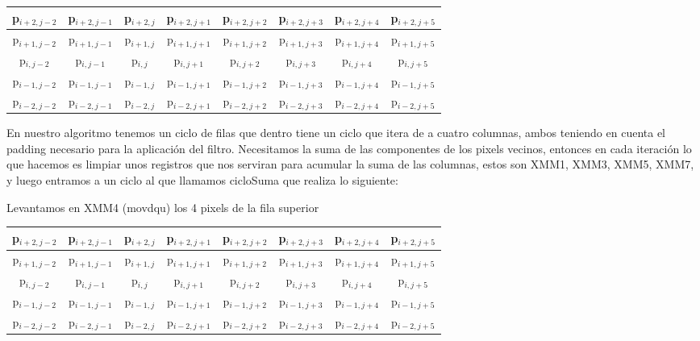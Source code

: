 \begin{table}[!h]
	\centering
	\begin{tabular}{| c | c | c | c | c | c | c | c |}
		\hline
		p$_{i+2,j-2}$ & p$_{i+2,j-1}$ & p$_{i+2,j}$ & p$_{i+2,j+1}$ & p$_{i+2,j+2}$ & p$_{i+2,j+3}$ & p$_{i+2,j+4}$ & p$_{i+2,j+5}$
		\\ \hline
		p$_{i+1,j-2}$ & p$_{i+1,j-1}$ & p$_{i+1,j}$ & p$_{i+1,j+1}$ & p$_{i+1,j+2}$ & p$_{i+1,j+3}$ & p$_{i+1,j+4}$ & p$_{i+1,j+5}$
		\\ \hline
		p$_{i,j-2}$ & p$_{i,j-1}$ & \cellcolor{blue!25}p$_{i,j}$ & \cellcolor{blue!25}p$_{i,j+1}$ & \cellcolor{blue!25}p$_{i,j+2}$ & \cellcolor{blue!25}p$_{i,j+3}$ & p$_{i,j+4}$ & p$_{i,j+5}$
		\\ \hline
		p$_{i-1,j-2}$ & p$_{i-1,j-1}$ & p$_{i-1,j}$ & p$_{i-1,j+1}$ & p$_{i-1,j+2}$ & p$_{i-1,j+3}$ & p$_{i-1,j+4}$ & p$_{i-1,j+5}$
		\\ \hline
		p$_{i-2,j-2}$ & p$_{i-2,j-1}$ & p$_{i-2,j}$ & p$_{i-2,j+1}$ & p$_{i-2,j+2}$ & p$_{i-2,j+3}$ & p$_{i-2,j+4}$ & p$_{i-2,j+5}$
		\\ \hline
	\end{tabular}
\end{table}

\newpage

En nuestro algoritmo tenemos un ciclo de filas que dentro tiene un ciclo que itera de a cuatro columnas, ambos teniendo en cuenta el padding necesario para la aplicación del filtro. Necesitamos la suma de las componentes de los pixels vecinos, entonces en cada iteración lo que hacemos es limpiar unos registros que nos serviran para acumular la suma de las columnas, estos son XMM1, XMM3, XMM5, XMM7, y luego entramos a un ciclo al que llamamos cicloSuma que realiza lo siguiente:

Levantamos en XMM4 (movdqu) los 4 pixels de la fila superior
\begin{table}[!h]
	\centering
	\begin{tabular}{| c | c | c | c | c | c | c | c |}
		\hline
		\cellcolor{blue!25}p$_{i+2,j-2}$ & \cellcolor{blue!25}p$_{i+2,j-1}$ & \cellcolor{blue!25}p$_{i+2,j}$ & \cellcolor{blue!25}p$_{i+2,j+1}$ & p$_{i+2,j+2}$ & p$_{i+2,j+3}$ & p$_{i+2,j+4}$ & p$_{i+2,j+5}$
		\\ \hline
		p$_{i+1,j-2}$ & p$_{i+1,j-1}$ & p$_{i+1,j}$ & p$_{i+1,j+1}$ & p$_{i+1,j+2}$ & p$_{i+1,j+3}$ & p$_{i+1,j+4}$ & p$_{i+1,j+5}$
		\\ \hline
		p$_{i,j-2}$ & p$_{i,j-1}$ & p$_{i,j}$ & p$_{i,j+1}$ & p$_{i,j+2}$ & p$_{i,j+3}$ & p$_{i,j+4}$ & p$_{i,j+5}$
		\\ \hline
		p$_{i-1,j-2}$ & p$_{i-1,j-1}$ & p$_{i-1,j}$ & p$_{i-1,j+1}$ & p$_{i-1,j+2}$ & p$_{i-1,j+3}$ & p$_{i-1,j+4}$ & p$_{i-1,j+5}$
		\\ \hline
		p$_{i-2,j-2}$ & p$_{i-2,j-1}$ & p$_{i-2,j}$ & p$_{i-2,j+1}$ & p$_{i-2,j+2}$ & p$_{i-2,j+3}$ & p$_{i-2,j+4}$ & p$_{i-2,j+5}$
		\\ \hline
	\end{tabular}	
\end{table}



